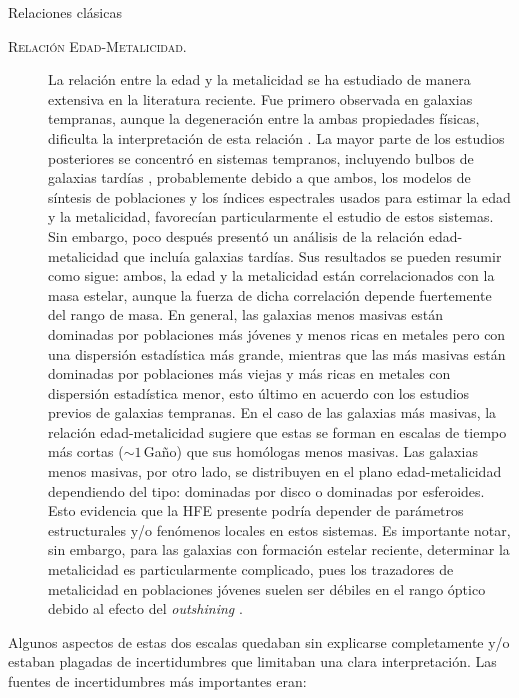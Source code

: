 \documentclass[xcolor=dvipsnames,4pt,hyperref={colorlinks,citecolor=black,linkcolor=black,urlcolor=black}]{beamer}
\begin{document}
\begin{frame}{Relaciones clásicas}
\begin{description}
\item[\textsc{Relación Edad-Metalicidad.}] La relación entre la edad y la metalicidad se ha
estudiado de manera extensiva en la literatura reciente. Fue primero observada en galaxias
tempranas, aunque la degeneración entre la ambas propiedades físicas, dificulta la interpretación de
esta relación \citep{Worthey1994}. La mayor parte de los estudios posteriores se concentró en
sistemas tempranos, incluyendo bulbos de galaxias tardías \citep{Proctor2002, Terlevich2002},
probablemente debido a que ambos, los modelos de síntesis de poblaciones y los índices espectrales
usados para estimar la edad y la metalicidad, favorecían particularmente el estudio de estos
sistemas.
%
Sin embargo, poco después \citet{Gallazzi2005} presentó un análisis de la relación edad-metalicidad
que incluía galaxias tardías. Sus resultados se pueden resumir como sigue: ambos, la edad y la
metalicidad están correlacionados con la masa estelar, aunque la fuerza de dicha correlación depende
fuertemente del rango de masa. En general, las galaxias menos masivas están dominadas por
poblaciones más jóvenes y menos ricas en metales pero con una dispersión estadística más grande,
mientras que las más masivas están dominadas por poblaciones más viejas y más ricas en metales con
dispersión estadística menor, esto último en acuerdo con los estudios previos de galaxias tempranas.
En el caso de las galaxias más masivas, la relación edad-metalicidad sugiere que estas se forman en
escalas de tiempo más cortas ($\sim1\,$Gaño) que sus homólogas menos masivas.
Las galaxias menos masivas, por otro lado, se distribuyen en el plano edad-metalicidad dependiendo
del tipo: dominadas por disco o dominadas por esferoides. Esto evidencia que la HFE presente podría
depender de parámetros estructurales y/o fenómenos locales en estos sistemas.
Es importante notar, sin embargo, para las galaxias con formación estelar reciente, determinar la
metalicidad es particularmente complicado, pues los trazadores de metalicidad en poblaciones jóvenes
suelen ser débiles en el rango óptico debido al efecto del \emph{outshining}
\citep[e.\,g.,][]{Conroy2013a}.
%
\end{description}

Algunos aspectos de estas dos escalas quedaban sin explicarse completamente y/o estaban plagadas de
incertidumbres que limitaban una clara interpretación. Las fuentes de incertidumbres más importantes
eran:


\end{frame}
\end{document}
